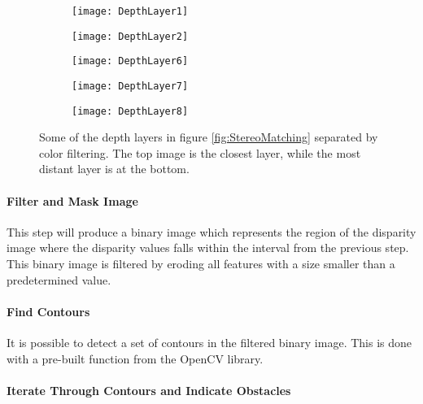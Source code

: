 \begin{wrapfigure}{l}{0.4\textwidth}
	\centering
	
	\begin{subfigure}[b]{0.35\textwidth}
		\texttt{[image: DepthLayer1]}
	\end{subfigure}
	\par\medskip
	\begin{subfigure}[b]{0.35\textwidth}
		\texttt{[image: DepthLayer2]}
	\end{subfigure}
	\par\medskip
	\begin{subfigure}[b]{0.35\textwidth}
		\texttt{[image: DepthLayer6]}
	\end{subfigure}
	\par\medskip
	\begin{subfigure}[b]{0.35\textwidth}
		\texttt{[image: DepthLayer7]}
	\end{subfigure}
	\par\medskip
	\begin{subfigure}[b]{0.35\textwidth}
		\texttt{[image: DepthLayer8]}
	\end{subfigure}
	
	\caption{Some of the depth layers in figure \ref{fig:StereoMatching} separated by color filtering. The top image is the closest layer, while the most distant layer is at the bottom.}
	\label{fig:layers2}
\end{wrapfigure}

\paragraph{Filter and Mask Image}

This step will produce a binary image which represents the region of the disparity image where the disparity values falls within the interval from the previous step. This binary image is filtered by eroding all features with a size smaller than a predetermined value.

\paragraph{Find Contours}

It is possible to detect a set of contours in the filtered binary image. This is done with a pre-built function from the OpenCV library.

\paragraph{Iterate Through Contours and Indicate Obstacles}


